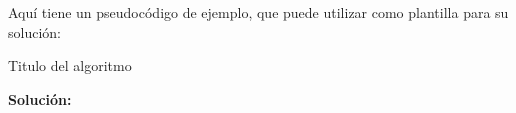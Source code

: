\documentclass[letterpaper,10pt]{article}
\begin{document}
\begin{enumerate}
Aquí tiene un pseudocódigo de ejemplo, que puede utilizar como plantilla para su solución:

\begin{center}
\begin{minipage}{0.6\textwidth}
\begin{algorithm}[H] %
\begin{algorithmic}[1]%

\ENDFOR
{}
\ENDWHILE


\end{algorithmic}
\caption{Titulo del algoritmo} %
\label{alg:oculto} %
\end{algorithm}
\end{minipage}
\end{center}

\textbf{Solución:}

\begin{center}
\begin{minipage}{0.9\textwidth}
\begin{algorithm}[H]
\begin{algorithmic}[1]


\end{algorithmic}
\end{algorithm}
\end{minipage}
\end{center}
\end{enumerate}
\end{document}

